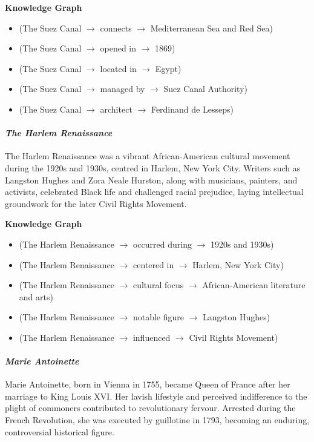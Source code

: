 \documentclass[11pt]{article}
\begin{document}
\textbf{Knowledge Graph}
\begin{itemize}[leftmargin=1em]
\item (The Suez Canal $\rightarrow$ connects $\rightarrow$ Mediterranean Sea and Red Sea)
\item (The Suez Canal $\rightarrow$ opened in $\rightarrow$ 1869)
\item (The Suez Canal $\rightarrow$ located in $\rightarrow$ Egypt)
\item (The Suez Canal $\rightarrow$ managed by $\rightarrow$ Suez Canal Authority)
\item (The Suez Canal $\rightarrow$ architect $\rightarrow$ Ferdinand de Lesseps)
\end{itemize}

\paragraph{\textit{The Harlem Renaissance}}
The Harlem Renaissance was a vibrant African-American cultural movement during the 1920s and 1930s, centred in Harlem, New York City.  Writers such as Langston Hughes and Zora Neale Hurston, along with musicians, painters, and activists, celebrated Black life and challenged racial prejudice, laying intellectual groundwork for the later Civil Rights Movement.

\textbf{Knowledge Graph}
\begin{itemize}[leftmargin=1em]
\item (The Harlem Renaissance $\rightarrow$ occurred during $\rightarrow$ 1920s and 1930s)
\item (The Harlem Renaissance $\rightarrow$ centered in $\rightarrow$ Harlem, New York City)
\item (The Harlem Renaissance $\rightarrow$ cultural focus $\rightarrow$ African-American literature and arts)
\item (The Harlem Renaissance $\rightarrow$ notable figure $\rightarrow$ Langston Hughes)
\item (The Harlem Renaissance $\rightarrow$ influenced $\rightarrow$ Civil Rights Movement)
\end{itemize}

\paragraph{\textit{Marie Antoinette}}
Marie Antoinette, born in Vienna in 1755, became Queen of France after her marriage to King Louis XVI.  Her lavish lifestyle and perceived indifference to the plight of commoners contributed to revolutionary fervour.  Arrested during the French Revolution, she was executed by guillotine in 1793, becoming an enduring, controversial historical figure.
\end{document}
